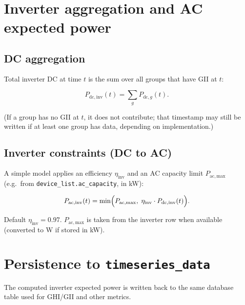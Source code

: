 \documentclass[11pt,a4paper]{article}
\begin{document}
\section{Inverter aggregation and AC expected power}

\subsection{DC aggregation}

Total inverter DC at time \(t\) is the sum over all groups that have GII at \(t\):

\begin{equation}
  P_{\mathrm{dc,inv}}(t) = \sum_{g} P_{\mathrm{dc},g}(t).
\end{equation}

(If a group has no GII at \(t\), it does not contribute; that timestamp may still be written if at least one group has data, depending on implementation.)

\subsection{Inverter constraints (DC to AC)}

A simple model applies an efficiency \(\eta_{\mathrm{inv}}\) and an AC capacity limit \(P_{\mathrm{ac,max}}\) (e.g.\ from \texttt{device\_list.ac\_capacity}, in kW):

\begin{equation}
  P_{\mathrm{ac,inv}}(t) = \min\Bigl( P_{\mathrm{ac,max}},\; \eta_{\mathrm{inv}} \cdot P_{\mathrm{dc,inv}}(t) \Bigr).
\end{equation}

Default \(\eta_{\mathrm{inv}} = 0.97\). \(P_{\mathrm{ac,max}}\) is taken from the inverter row when available (converted to W if stored in kW).

\section{Persistence to \texttt{timeseries\_data}}

The computed inverter expected power is written back to the same database table used for GHI/GII and other metrics.
\end{document}
